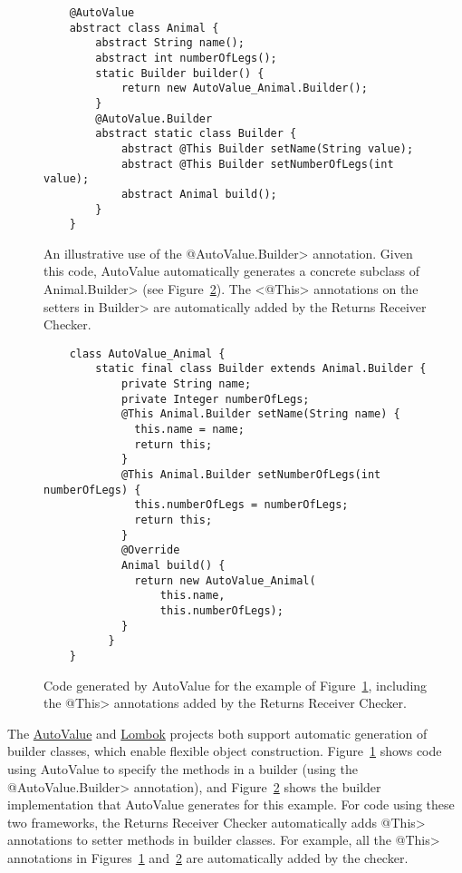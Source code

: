 
\begin{figure}
    \begin{Verbatim}
    @AutoValue
    abstract class Animal {
        abstract String name();
        abstract int numberOfLegs();
        static Builder builder() {
            return new AutoValue_Animal.Builder();
        }
        @AutoValue.Builder
        abstract static class Builder {
            abstract @This Builder setName(String value);
            abstract @This Builder setNumberOfLegs(int value);
            abstract Animal build();
        }
    }
    \end{Verbatim}
    \caption{An illustrative use of the \<@AutoValue.Builder> annotation.
    Given this code, AutoValue automatically generates a concrete subclass of
    \<Animal.Builder> (see Figure~\ref{fig-autovalue-builder-generated}).  The <@This> annotations on the setters in
    \<Builder> are automatically added by the Returns Receiver Checker.}
    \label{fig-autovalue-builder}
\end{figure}

\begin{figure}
    \begin{Verbatim}
    class AutoValue_Animal {
        static final class Builder extends Animal.Builder {
            private String name;
            private Integer numberOfLegs;
            @This Animal.Builder setName(String name) {
              this.name = name;
              return this;
            }
            @This Animal.Builder setNumberOfLegs(int numberOfLegs) {
              this.numberOfLegs = numberOfLegs;
              return this;
            }
            @Override
            Animal build() {
              return new AutoValue_Animal(
                  this.name,
                  this.numberOfLegs);
            }
          }
    }
    \end{Verbatim}
    \caption{Code generated by AutoValue for the example of
    Figure~\ref{fig-autovalue-builder}, including the \<@This> annotations added
    by the Returns Receiver Checker.}
    \label{fig-autovalue-builder-generated}
\end{figure}

The \href{https://github.com/google/auto/tree/master/value}{AutoValue} and
\href{https://projectlombok.org/}{Lombok} projects both support automatic
generation of builder classes, which enable flexible object construction.
Figure~\ref{fig-autovalue-builder} shows code using AutoValue to specify the
methods in a builder (using the \<@AutoValue.Builder> annotation), and
Figure~\ref{fig-autovalue-builder-generated} shows the builder implementation
that AutoValue generates for this example.  For code using these two frameworks,
the Returns Receiver Checker automatically adds \<@This> annotations to setter
methods in builder classes.  For example, all the \<@This> annotations in
Figures~\ref{fig-autovalue-builder} and~\ref{fig-autovalue-builder-generated}
are automatically added by the checker.
